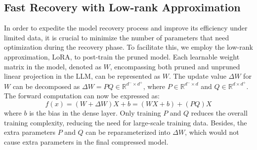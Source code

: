 \subsection{Fast Recovery with Low-rank Approximation} \label{sec:recovery}
In order to expedite the model recovery process and improve its efficiency under limited data, it is crucial to minimize the number of parameters that need optimization during the recovery phase. To facilitate this, we employ the low-rank approximation,  LoRA\cite{hulora}, to post-train the pruned model. Each learnable weight matrix in the model, denoted as $W$, encompassing both pruned and unpruned linear projection in the LLM, can be represented as $W$. The update value $\Delta W$ for $W$ can be decomposed as $\Delta W = PQ \in \mathbb{R}^{d^- \times d^+}$, where $P \in \mathbb{R}^{d^- \times d}$ and $Q \in \mathbb{R}^{d \times d^+}$. The forward computation can now be expressed as:
\begin{equation}
    f(x) = (W+\Delta W)X + b = (WX + b) + (PQ)X
\end{equation}
where $b$ is the bias in the dense layer. Only training $P$ and $Q$ reduces the overall training complexity, reducing the need for large-scale training data. Besides, the extra parameters $P$ and $Q$ can be reparameterized into $\Delta W$, which would not cause extra parameters in the final compressed model. 

